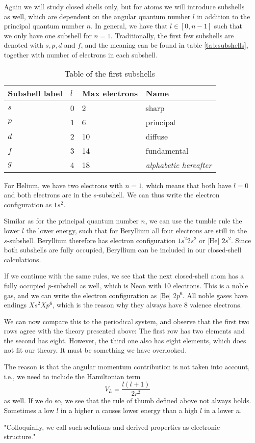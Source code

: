 Again we will study closed shells only, but for atoms we will introduce subshells as well, which are dependent on the angular quantum number $l$ in addition to the principal quantum number $n$. In general, we have that $l\in [0,n-1]$ such that we only have one subshell for $n=1$. Traditionally, the first few subshells are denoted with $s, p, d$ and $f$, and the meaning can be found in table \eqref{tab:subshells}, together with number of electrons in each subshell.

\begin{table} [H]
	\caption{Table of the first subshells  \vspace{2mm}}
	\begin{tabularx}{\textwidth}{X|X:X:X} \hline\hline
		\label{tab:subshells}
		Subshell label & $l$ & Max electrons & Name \\ \hline
		$s$ & 0 & 2 & sharp\\ 
		$p$ & 1 & 6 & principal\\
		$d$ & 2 & 10 & diffuse \\
		$f$ & 3 & 14 & fundamental \\
		$g$ & 4 & 18 & \textit{alphabetic hereafter} \\ \hline\hline
	\end{tabularx}
\end{table}

For Helium, we have two electrons with $n=1$, which means that both have $l=0$ and both electrons are in the $s$-subshell. We can thus write the electron configuration as $1s^2$. 

Similar as for the principal quantum number $n$, we can use the tumble rule the lower $l$ the lower energy, such that for Beryllium all four electrons are still in the $s$-subshell. Beryllium therefore has electron configuration $1s^2 2s^2$ or [He] $2s^2$. Since both subshells are fully occupied, Beryllium can be included in our closed-shell calculations. 

If we continue with the same rules, we see that the next closed-shell atom has a fully occupied $p$-subshell as well, which is Neon with 10 electrons. This is a noble gas, and we can write the electron configuration as [Be] $2p^6$. All noble gases have endings $Xs^2 Xp^6$, which is the reason why they always have 8 valence electrons.

We can now compare this to the periodical system, and observe that the first two rows agree with the theory presented above: The first row has two elements and the second has eight. However, the third one also has eight elements, which does not fit our theory. It must be something we have overlooked. 

The reason is that the angular momentum contribution is not taken into account, i.e., we need to include the Hamiltonian term
\begin{equation}
V_L=\frac{l(l+1)}{2r^2}
\end{equation}
as well. If we do so, we see that the rule of thumb defined above not always holds. Sometimes a low $l$ in a higher $n$ causes lower energy than a high $l$ in a lower $n$. 

"Colloquially, we call such solutions and derived properties as electronic structure."


